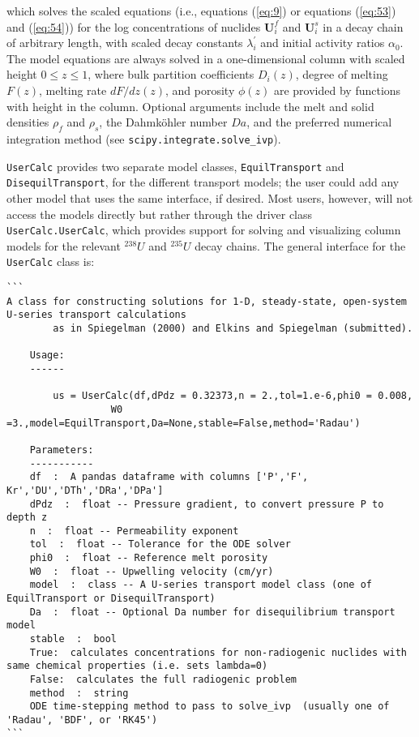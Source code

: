 \documentclass[11pt]{article}
\begin{document}
which solves the scaled equations (i.e., equations (\ref{eq:9}) or equations (\ref{eq:53}) and (\ref{eq:54})) for the log concentrations of nuclides $\mathbf{U}_i^f$ and $\mathbf{U}_i^s$ in a decay chain of arbitrary length, with scaled decay constants $\lambda^\prime_i$ and initial activity ratios $\alpha_0$. The model equations are always solved in a one-dimensional column with scaled height $0 \leq z \leq 1$, where bulk partition coefficients $D_i(z)$, degree of melting $F(z)$, melting rate $dF/dz(z)$, and porosity $\phi(z)$ are provided by functions with height in the column. Optional arguments include the melt and solid densities $\rho_f$ and $\rho_s$, the Dahmköhler number $Da$, and the preferred numerical integration method (see \colorbox{gray!20}{\texttt{scipy.integrate.solve\_ivp}}).

\colorbox{gray!20}{\texttt{UserCalc}} provides two separate model classes, \colorbox{gray!20}{\texttt{EquilTransport}} and \colorbox{gray!20}{\texttt{DisequilTransport}}, for the different transport models; the user could add any other model that uses the same interface, if desired. Most users, however, will not access the models directly but rather through the driver class \colorbox{gray!20}{\texttt{UserCalc.UserCalc}}, which provides support for solving and visualizing column models for the relevant $^{238}U$ and $^{235}U$ decay chains. The general interface for the \colorbox{gray!20}{\texttt{UserCalc}} class is:
\bigskip
\begin{lstlisting}[showstringspaces=false]
```
A class for constructing solutions for 1-D, steady-state, open-system  U-series transport calculations
        as in Spiegelman (2000) and Elkins and Spiegelman (submitted).

    Usage:
    ------
     
        us = UserCalc(df,dPdz = 0.32373,n = 2.,tol=1.e-6,phi0 = 0.008,
                  W0 =3.,model=EquilTransport,Da=None,stable=False,method='Radau')

    Parameters:
    -----------
    df  :  A pandas dataframe with columns ['P','F', Kr','DU','DTh','DRa','DPa']
    dPdz  :  float -- Pressure gradient, to convert pressure P to depth z
    n  :  float -- Permeability exponent
    tol  :  float -- Tolerance for the ODE solver
    phi0  :  float -- Reference melt porosity
    W0  :  float -- Upwelling velocity (cm/yr)
    model  :  class -- A U-series transport model class (one of EquilTransport or DisequilTransport)
    Da  :  float -- Optional Da number for disequilibrium transport model
    stable  :  bool
	True:  calculates concentrations for non-radiogenic nuclides with same chemical properties (i.e. sets lambda=0)
	False:  calculates the full radiogenic problem
    method  :  string
	ODE time-stepping method to pass to solve_ivp  (usually one of 'Radau', 'BDF', or 'RK45')
```
\end{lstlisting}
\bigskip
\end{document}
